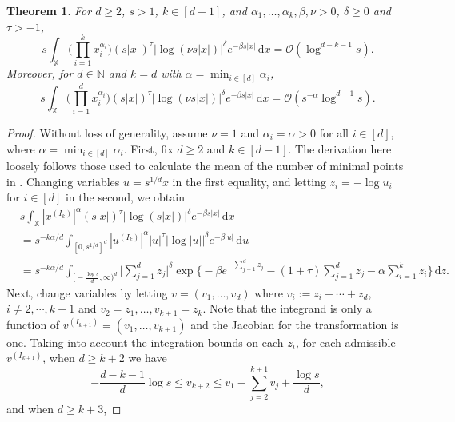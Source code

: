 \documentclass[11pt,reqno]{amsart}
\numberwithin{equation}{section}
\newtheorem{theorem}{Theorem}[section]
\theoremstyle{definition}
\newcommand{\N}{\mathbb{N}}
\newcommand{\XX}{\mathbb{X}}
\newcommand{\diff}{{\,\mathrm d}}
\begin{document}
\begin{theorem}\label{thm:mean} For $d \ge 2$, $s>1$, $k \in [d-1]$, and $\alpha_1,\dots,\alpha_k, \beta, \nu>0$, $\delta \ge 0$ and $\tau>-1$,
	\begin{equation*}
	s\int_{\XX} \Big(\prod_{i=1}^k x_i^{\alpha_i}\Big) (s|x|)^{\tau}  \Big|\log (\nu s |x|)\Big|^\delta  e^{-\beta s |x|} \diff x=\mathcal{O}(\log^{d-k-1} s).
	\end{equation*}
Moreover, for $d \in \N$ and $k=d$ with $\alpha=\min_{i \in [d]} \alpha_i$,
\begin{equation*}
	s\int_{\XX} \Big(\prod_{i=1}^d x_i^{\alpha_i}\Big) (s|x|)^{\tau}  \Big|\log (\nu s |x|)\Big|^\delta  e^{-\beta s |x|} \diff x=\mathcal{O}(s^{-\alpha}\log^{d-1} s).
\end{equation*}
\end{theorem}
\begin{proof}
	Without loss of generality, assume $\nu=1$ and $\alpha_i=\alpha>0$ for all $i \in [d]$, where $\alpha=\min_{i \in [d]} \alpha_i$. First, fix $d \ge 2$ and $k \in [d-1]$. The
	derivation here loosely follows those used to calculate the mean of
	the number of minimal points in
	\cite[Sec.~2]{BDHT05}. Changing variables $u=s^{1/d}x$ in the first equality, and
	letting $z_i=-\log u_i$ for $i\in [d]$ in the second, we obtain
	\begin{align*}
	&s\int_{\XX} |x^{(I_k)}|^{\alpha} (s|x|)^{\tau}  \Big|\log (s |x|)\Big|^\delta  e^{-\beta s |x|} \diff x\\
	&=s^{-k \alpha/d}\int_{[0, s^{1/d}]^d} |u^{(I_k)}|^{\alpha} |u|^{\tau} \big|\log |u|\big|^\delta e^{-\beta|u|}   \diff u\\
	&=s^{-k \alpha/d} \int_{\big[-\frac{\log s}{d}, \infty\big)^d}
	\Big|\sum_{j=1}^d z_j\Big|^\delta \exp \bigg\{-\beta e^{- \sum_{j=1}^d z_j} - (1+\tau) \sum_{j=1}^d z_j - \alpha \sum_{i=1}^k  z_i
	\bigg\}  \diff z.
	\end{align*}
	Next, change variables by letting $v=(v_1, \dots, v_d)$
	where $v_i:=z_i+\cdots+z_d$, $i\not=2,\cdots, k+1$ and $v_2=z_1, \dots ,v_{k+1}=z_{k}$. Note that the
	integrand is only a function of $v^{(I_{k+1})}=(v_1,\dots,v_{k+1})$ and the Jacobian for the transformation is one. Taking into account the
	integration bounds on each $z_i$, for each admissible $v^{(I_{k+1})}$, when $d \ge k+2$ we have 
	\begin{displaymath}
	- \frac{d-k-1}{d} \log s \le v_{k+2} \le v_1-\sum_{j=2}^{k+1}v_j + \frac{\log s}{d},
	\end{displaymath}
	and when $d \ge k+3$,

\end{proof}
\end{document}
